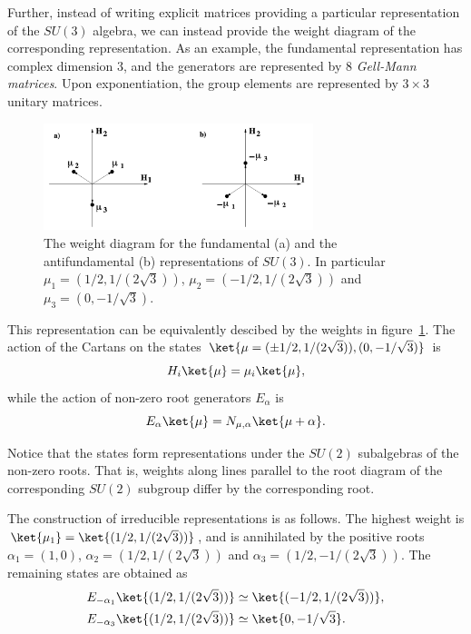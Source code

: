 Further, instead of writing explicit matrices providing a particular representation of the $SU(3)$ algebra, we can instead provide the weight diagram of the corresponding representation. As an example, the fundamental representation has complex dimension $3$, and the generators are represented by $8$ \emph{Gell-Mann matrices}. Upon exponentiation, the group elements are represented by $3 \times 3$ unitary matrices.

\begin{figure}
    \centering
    \includegraphics[width=0.7\textwidth]{figures/su3-weights.png}
    \caption{The weight diagram for the fundamental (a) and the antifundamental (b) representations of $SU(3)$. In particular $\mu_1 = (1/2, 1/(2\sqrt{3}))$, $\mu_2 = (-1/2, 1/(2\sqrt{3}))$ and $\mu_3 = (0, -1/\sqrt{3})$.}
    \label{fig:weight-su3-fund}
\end{figure}

This representation can be equivalently descibed by the weights in figure~\ref{fig:weight-su3-fund}. The action of the Cartans on the states $\ket{\mu = (\pm 1/2, 1/(2\sqrt{3})), (0,-1/\sqrt{3})}$ is
\begin{equation}
    H_i \ket{\mu} = \mu_i \ket{\mu} ,
\end{equation}
while the action of non-zero root generators $E_\alpha$ is
\begin{equation}
    E_\alpha \ket{\mu} = N_{\mu,\alpha}\ket{\mu + \alpha} .
\end{equation}

Notice that the states form representations under the $SU(2)$ subalgebras of the non-zero roots. That is, weights along lines parallel to the root diagram of the corresponding $SU(2)$ subgroup differ by the corresponding root.

The construction of irreducible representations is as follows. The highest weight is $\ket{\mu_1} = \ket{(1/2, 1/(2\sqrt{3}))}$, and is annihilated by the positive roots $\alpha_1 = (1,0)$, $\alpha_2 = (1/2, 1/(2\sqrt{3}))$ and $\alpha_3 = (1/2, -1/(2\sqrt{3}))$. The remaining states are obtained as
\begin{equation}
\begin{aligned}
    E_{-\alpha_1} \ket{(1/2,1/(2\sqrt{3}))} &\simeq \ket{(-1/2,1/(2\sqrt{3}))} ,\\
    E_{-\alpha_3} \ket{(1/2, 1/(2\sqrt{3}))} & \simeq \ket{0, -1/\sqrt{3}} .
\end{aligned}
\end{equation}

